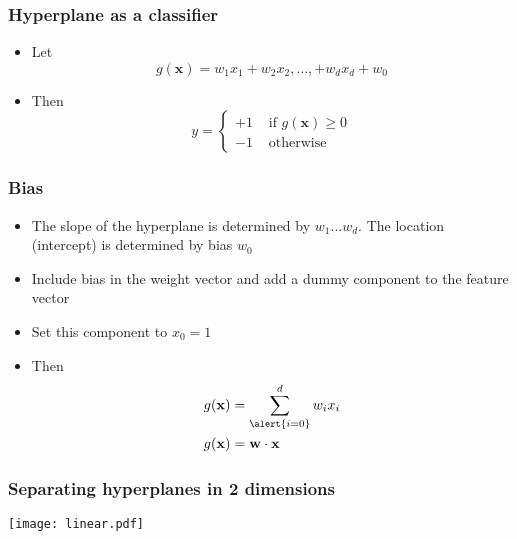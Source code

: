 \documentclass[14pt,mathserif]{beamer}
\newcommand{\x}{\mathbf{x}}
\newcommand{\w}{\mathbf{w}}
\begin{document}
 \begin{frame}\frametitle{Hyperplane as a classifier}
   \begin{itemize}
   \item Let \[
     g(\x) =  w_1x_1 + w_2x_2, \ldots, + w_dx_d + w_0
     \]
 \item Then
   \[ y = 
   \begin{cases}
    +1 & \text{ if } g(\x) \geq 0\\
    -1 & \text{ otherwise }
   \end{cases}
 \]
   \end{itemize}
 \end{frame}

\begin{frame}
 \frametitle{Bias}
\begin{itemize}
\item The slope of the hyperplane is determined by
  $w_1...w_d$. The location (intercept) is determined by  bias $w_0$
\item Include bias in the
  weight vector and add a dummy component to the feature vector
\item Set this component to $x_0 = 1$
\item Then 
 \begin{align}
 g(\x) & = \sum_{\alert{i=0}}^d w_i x_i\\
 g(\x) & = \w \cdot \x
\end{align}
\end{itemize}
\end{frame}

\begin{frame}
\label{hyperplanes}
 \begin{center}\frametitle{Separating hyperplanes in 2 dimensions}
\vskip -0.5cm 
\texttt{[image: linear.pdf]}
\end{center}
\end{frame}
\end{document}
